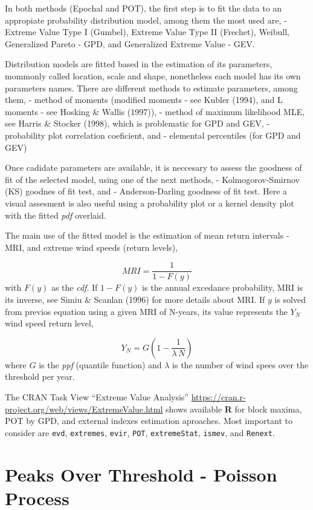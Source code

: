 \documentclass[12pt,twoside]{reedthesis}
\begin{document}
In both methods (Epochal and POT), the first step is to fit the data to an appropiate probability distribution model, among them the most used are, - Extreme Value Type I (Gumbel), Extreme Value Type II (Frechet), Weibull, Generalized Pareto - GPD, and Generalized Extreme Value - GEV.

Distribution models are fitted based in the estimation of its parameters, mommonly called location, scale and shape, nonetheless each model has its own parameters names. There are different methods to estimate parameters, among them, - method of moments (modified moments - see Kubler (1994), and L moments - see Hosking \& Wallis (1997)), - method of maximum likelihood MLE, see Harris \& Stocker (1998), which is problematic for GPD and GEV, - probability plot correlation coeficient, and - elemental percentiles (for GPD and GEV)

Once cadidate parameters are available, it is neccesary to assess the goodness of fit of the selected model, using one of the next methods, - Kolmogorov-Smirnov (KS) goodnes of fit test, and - Anderson-Darling goodness of fit test. Here a visual assesment is also useful using a probability plot or a kernel density plot with the fitted \emph{pdf} overlaid.

The main use of the fitted model is the estimation of mean return intervals - MRI, and extreme wind speeds (return levels),

\[
MRI=\frac{1}{1-F(y)}
\]
with \(F(y)\) as the \emph{cdf}. If \(1-F(y)\) is the annual excedance probability, MRI is its inverse, see Simiu \& Scanlan (1996) for more details about MRI. If \(y\) is solved from previos equation using a given MRI of N-years, its value represents the \(Y_N\) wind speed return level,

\[
Y_N = G\left(1-\frac{1}{\lambda\,N}\right)
\]
where \(G\) is the \emph{ppf} (quantile function) and \(\lambda\) is the number of wind spees over the threshold per year.

The CRAN Task View ``Extreme Value Analysis'' \url{https://cran.r-project.org/web/views/ExtremeValue.html} shows available \textbf{R} for block maxima, POT by GPD, and external indexes estimation aproaches. Most important to consider are \texttt{evd}, \texttt{extremes}, \texttt{evir}, \texttt{POT}, \texttt{extremeStat}, \texttt{ismev}, and \texttt{Renext}.

\hypertarget{pot-pp}{%
\section{Peaks Over Threshold - Poisson Process}\label{pot-pp}}
\end{document}

